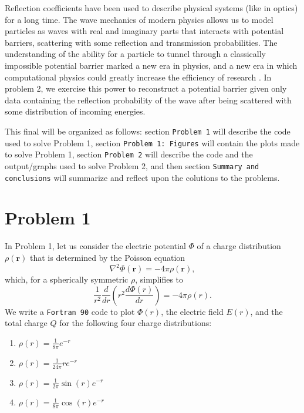 \documentclass[12pt]{article}
\begin{document}
Reflection coefficients have been used to describe physical systems (like in optics) for a long time.  The wave mechanics of modern physics allows us to model particles as waves with real and imaginary parts that interacts with potential barriers, scattering with some reflection and transmission probabilities.  The understanding of the ability for a particle to tunnel through a classically impossible potential barrier marked a new era in physics, and a new era in which computational physics could greatly increase the efficiency of research \cite{reflection}.  In problem 2, we exercise this power to reconstruct a potential barrier given only data containing the reflection probability of the wave after being scattered with some distribution of incoming energies.  

This final will be organized as follows: section {\tt Problem 1} will describe the code used to solve Problem 1, section {\tt Problem 1: Figures} will contain the plots made to solve Problem 1, section {\tt Problem 2} will describe the code and the output/graphs used to solve Problem 2, and then section {\tt Summary and conclusions} will summarize and reflect upon the colutions to the problems.

\section{Problem 1}

In Problem 1, let us consider the electric potential $\Phi$ of a charge distribution $\rho(\textbf{r})$ that is determined by the Poisson equation \[\nabla^2\Phi(\textbf{r})=-4\pi\rho(\textbf{r}),\] which, for a spherically symmetric $\rho$, simplifies to \[\frac{1}{r^2}\frac{d}{dr}\left(r^2\frac{d\Phi(r)}{dr}\right)=-4\pi\rho(r).\]  We write a {\tt Fortran 90} code to plot $\Phi(r)$, the electric field $E(r)$, and the total charge $Q$ for the following four charge distributions:

\begin{enumerate}
    \begin{enumerate}
        \item $\rho(r)=\frac{1}{8\pi}e^{-r}$
        \item $\rho(r)=\frac{1}{24\pi}re^{-r}$
        \item $\rho(r)=\frac{1}{2\pi}\sin(r)e^{-r}$
        \item $\rho(r)=\frac{1}{8\pi}\cos(r)e^{-r}$
    \end{enumerate}
\end{enumerate}
\end{document}
